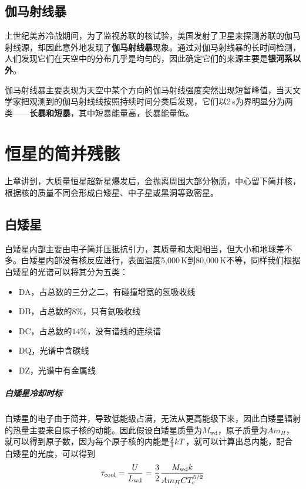 \documentclass[openany]{ctexbook}
\begin{document}
\section{伽马射线暴}
上世纪美苏冷战期间，为了监视苏联的核试验，美国发射了卫星来探测苏联的伽马射线源，却因此意外地发现了\textbf{伽马射线暴}现象。通过对伽马射线暴的长时间检测，人们发现它们在天空中的分布几乎是均匀的，因此确定它们的来源主要是\textbf{银河系以外}。

伽马射线暴主要表现为天空中某个方向的伽马射线强度突然出现短暂峰值，当天文学家把观测到的伽马射线线按照持续时间分类后发现，它们以2\,s为界明显分为两类——\textbf{长暴和短暴}，其中短暴能量高，长暴能量低。

\chapter{恒星的简并残骸}
上章讲到，大质量恒星超新星爆发后，会抛离周围大部分物质，中心留下简并核，根据核的质量不同会形成白矮星、中子星或黑洞等致密星。

\section{白矮星}
白矮星内部主要由电子简并压抵抗引力，其质量和太阳相当，但大小和地球差不多。白矮星内部没有核反应进行，表面温度5,000\,K到80,000\,K不等，同样我们根据白矮星的光谱可以将其分为五类：
\begin{itemize}
  \item DA，占总数的三分之二，有碰撞增宽的氢吸收线
  \item DB，占总数的$8\%$，只有氦吸收线
  \item DC，占总数的$14\%$，没有谱线的连续谱
  \item DQ，光谱中含碳线
  \item DZ，光谱中有金属线
\end{itemize}

\paragraph{白矮星冷却时标}
白矮星的电子由于简并，导致低能级占满，无法从更高能级下来，因此白矮星辐射的热量主要来自原子核的动能。因此假设白矮星质量为$M_\mathrm{wd}$，原子质量为$Am_H$，就可以得到原子数，因为每个原子核的内能是${2\over 3}kT$，就可以计算出总内能，配合白矮星的光度，可以得到
\begin{equation}
  \tau_\mathrm{cool}={U\over L_\mathrm{wd}}={3\over 2}{M_\mathrm{wd}k\over Am_H C T_c^{5/2}}
\end{equation}
\end{document}
